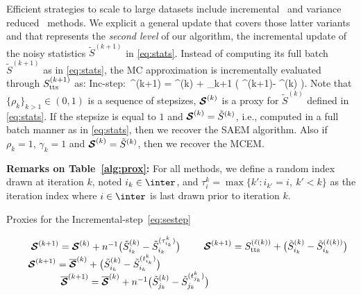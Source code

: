 \documentclass[conference,letterpaper]{IEEEtran}
\makeatletter
\newcounter{protocol}
\newenvironment{protocol}[1][htb]{%
  \let\c@algorithm\c@protocol
  \renewcommand{\ALG@name}{Protocol}%
  \begin{algorithm}[#1]%
  }{\end{algorithm}
}
\makeatother
\begin{document}
Efficient strategies to scale to large datasets include incremental~\cite{neal1998view} and variance reduced~\cite{chen2018stochastic, johnson:zhang:2013} methods.
We explicit a general update that covers those latter variants and that represents the \textit{second level} of our algorithm, \ie the incremental update of the noisy statistics $\tilde{S}^{(k+1)}$ in \eqref{eq:stats}. 
Instead of computing its full batch $\tilde{S}^{(k+1)}$ as in \eqref{eq:stats}, the MC approximation is incrementally evaluated through $S_{\textrm{tts}}^{(k+1)}$ as:
\beq \label{eq:sestep}
\textsf{Inc-step}:~\stt^{(k+1)} = \stt^{(k)} + \rho_{k+1} \big( \StocEstep^{(k+1)}- \stt^{(k)}  \big)\eqs.
\eeq
Note that $\{ \rho_{k} \}_{k>1} \in (0,1)$ is a sequence of stepsizes, ${\bm{\mathcal{S}}}^{(k)}$ is a proxy for $\tilde{S}^{(k)}$ defined in \eqref{eq:stats}.
If the stepsize is equal to $1$ and ${\bm{\mathcal{S}}}^{(k)} = \tilde{S}^{(k)}$, i.e., computed in a full batch manner as in \eqref{eq:stats}, then we recover the SAEM algorithm.
Also if $\rho_{k}=1$, $\gamma_{k}=1$ and ${\bm{\mathcal{S}}}^{(k)} = \tilde{S}^{(k)}$, then we recover the MCEM.

\vspace{0.08in}
\noindent \textbf{Remarks on Table~\ref{alg:prox}:} For all methods, we define a random index drawn at iteration $k$, noted $i_k \in \inter$, and $\tau_i^k = \max \{ k' : i_{k'} = i,~k' < k \}$ as the iteration index where $i \in \inter$ is last drawn prior to iteration $k$.

 \begin{protocol}[H]
\caption{Proxies for the Incremental-step~\eqref{eq:sestep}}\label{alg:prox}
  \begin{algorithmic}[1]
  \STATE \textsf{\ISAEM\ }$\hspace{0.7cm} \StocEstep^{(k+1)} = \StocEstep^{(k)} + n^{-1} \big( \tilde{S}_{i_k}^{(k)}  - \tilde{S}_{i_k}^{(\tau_{i_k}^k)} \big) \label{eq:isaem}$
    \STATE \textsf{\SAEMVR\ }$\hspace{0.5cm} \StocEstep^{(k+1)}  = \stt^{(\ell(k))} +  \big( \tilde{S}_{i_k}^{(k)}  -\tilde{S}_{i_k}^{(\ell(k))}   \big) \label{eq:vrsaem}$
      \STATE \textsf{\FISAEM\ }$\hspace{0.6cm} \StocEstep^{(k+1)} = \overline{\StocEstep}^{(k)} + \big( \tilde{S}_{i_k}^{(k)}  - \tilde{S}_{i_k}^{(t_{i_k}^k)} \big) \label{eq:fisaem}$\\
             $ \hspace{1.95cm} \overline{{\bm{\mathcal{S}}}}^{(k+1)} = \overline{{\bm{\mathcal{S}}}}^{(k)} + n^{-1} \big( \tilde{S}_{j_k}^{(k)}  - \tilde{S}_{j_k}^{(t_{j_k}^k)} \big)$
  \end{algorithmic}
\end{protocol}
\end{document}
